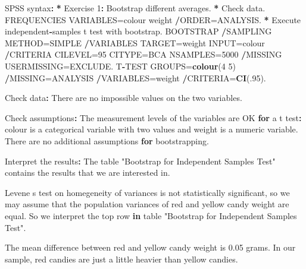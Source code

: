 \documentclass[a4paper]{book}
\newenvironment{Shaded}{\begin{snugshade}}{\end{snugshade}}
\newcommand{\KeywordTok}[1]{\textcolor[rgb]{0,0,0}{\textbf{#1}}}
\newcommand{\DecValTok}[1]{\textcolor[rgb]{0.00,0.00,0.00}{#1}}
\newcommand{\FloatTok}[1]{\textcolor[rgb]{0.00,0.00,0.00}{#1}}
\newcommand{\StringTok}[1]{\textcolor[rgb]{0.00,0.00,0.00}{#1}}
\newcommand{\ControlFlowTok}[1]{\textcolor[rgb]{0.00,0.00,0.00}{\textbf{#1}}}
\newcommand{\OperatorTok}[1]{\textcolor[rgb]{0.00,0.00,0.00}{\textbf{#1}}}
\newcommand{\ErrorTok}[1]{\textcolor[rgb]{0.00,0.00,0.00}{\textbf{#1}}}
\newcommand{\NormalTok}[1]{#1}
\theoremstyle{definition}
\theoremstyle{definition}
\theoremstyle{definition}
\theoremstyle{remark}
\begin{document}
\begin{Shaded}
\begin{Highlighting}[]
\NormalTok{SPSS syntax}\OperatorTok{:}\StringTok{  }
\StringTok{    }
\ErrorTok{*}\StringTok{ }\NormalTok{Exercise }\DecValTok{1}\OperatorTok{:}\StringTok{ }\NormalTok{Bootstrap different averages.  }
\OperatorTok{*}\StringTok{ }\NormalTok{Check data.  }
\NormalTok{FREQUENCIES VARIABLES=colour weight  }
  \OperatorTok{/}\NormalTok{ORDER=ANALYSIS.  }
\OperatorTok{*}\StringTok{ }\NormalTok{Execute independent}\OperatorTok{-}\NormalTok{samples t test with bootstrap.  }
\NormalTok{BOOTSTRAP  }
  \OperatorTok{/}\NormalTok{SAMPLING METHOD=SIMPLE  }
  \OperatorTok{/}\NormalTok{VARIABLES TARGET=weight INPUT=colour   }
  \OperatorTok{/}\NormalTok{CRITERIA CILEVEL=}\DecValTok{95}\NormalTok{ CITYPE=BCA  NSAMPLES=}\DecValTok{5000}  
  \OperatorTok{/}\NormalTok{MISSING USERMISSING=EXCLUDE.  }
\NormalTok{T}\OperatorTok{-}\NormalTok{TEST GROUPS=}\KeywordTok{colour}\NormalTok{(}\DecValTok{4} \DecValTok{5}\NormalTok{)  }
  \OperatorTok{/}\NormalTok{MISSING=ANALYSIS  }
  \OperatorTok{/}\NormalTok{VARIABLES=weight  }
  \OperatorTok{/}\NormalTok{CRITERIA=}\KeywordTok{CI}\NormalTok{(.}\DecValTok{95}\NormalTok{).  }
  
\NormalTok{Check data}\OperatorTok{:}\StringTok{  }
\StringTok{  }
\NormalTok{There are no impossible values on the two variables.    }
      
\NormalTok{Check assumptions}\OperatorTok{:}\StringTok{  }
\StringTok{  }
\NormalTok{The measurement levels of the variables are OK }\ControlFlowTok{for}\NormalTok{ a t test}\OperatorTok{:}\StringTok{ }
\NormalTok{colour is a categorical variable with two values and weight is}
\NormalTok{a numeric variable. There are no additional assumptions }\ControlFlowTok{for} 
\NormalTok{bootstrapping.}
    
\NormalTok{Interpret the results}\OperatorTok{:}\StringTok{   }
\StringTok{  }
\NormalTok{The table }\StringTok{"Bootstrap for Independent Samples Test"}\NormalTok{ contains   }
\NormalTok{the results that we are interested in.   }
  
\NormalTok{Levene s test on homegeneity of variances is not statistically  }
\NormalTok{significant, so we may assume that the population variances of  }
\NormalTok{red and yellow candy weight are equal. So we interpret the  }
\NormalTok{top row }\ControlFlowTok{in}\NormalTok{ table }\StringTok{"Bootstrap for Independent Samples Test"}\NormalTok{.  }
  
\NormalTok{The mean difference between red and yellow candy weight is  }
\FloatTok{0.05}\NormalTok{ grams. In our sample, red candies are just a little  }
\NormalTok{heavier than yellow candies.  }
  

\end{Highlighting}
\end{Shaded}
\end{document}
